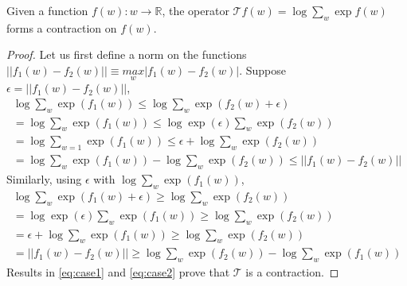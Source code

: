 \documentclass{article}
\begin{document}
\begin{customthm}{2}
  Given a function $f(w):w\rightarrow \mathbb{R}$, the operator $\mathcal{T}f(w)=\log \sum_{w} \exp{f(w)}$ forms a contraction on $f(w)$. 
\end{customthm}
\begin{proof}
  Let us first define a norm on the functions $||f_{1}(w) - f_{2}(w)|| \equiv \underset{w}{max}|f_{1}(w) - f_{2}(w)|$. Suppose $\epsilon = ||f_{1}(w) - f_{2}(w)||$,
  \begin{gather}
      \log \sum_{w}\exp{(f_{1}(w))} \leq \log \sum_{w}\exp{(f_{2}(w) + \epsilon)} \nonumber \\
      = \log \sum_{w}\exp{(f_{1}(w))} \leq \log \exp{(\epsilon)} \sum_{w}\exp{(f_{2}(w))} \nonumber \\
      = \log \sum_{w=1}\exp{(f_{1}(w))} \leq \epsilon + \log \sum_{w} \exp{(f_{2}(w))} \nonumber \\
      = \log \sum_{w} \exp{(f_{1}(w))} - \log \sum_{w} \exp{(f_{2}(w))} \leq ||f_{1}(w) - f_{2}(w)|| \label{eq:case1}
  \end{gather}
  Similarly, using $\epsilon$ with $\log \sum_{w} \exp{(f_{1}(w))}$,
  \begin{gather}
      \log \sum_{w}\exp{(f_{1}(w) + \epsilon)} \geq \log \sum_{w}\exp{(f_{2}(w))} \nonumber \\
      = \log \exp{(\epsilon)}\sum_{w}\exp{(f_{1}(w))} \geq \log \sum_{w}\exp{(f_{2}(w))} \nonumber \\
      = \epsilon + \log \sum_{w} \exp{(f_{1}(w))} \geq \log \sum_{w}\exp{(f_{2}(w))} \nonumber \\
      = ||f_{1}(w) - f_{2}(w)|| \geq \log \sum_{w} \exp{(f_{2}(w))} - \log \sum_{w} \exp{(f_{1}(w))} \label{eq:case2}
  \end{gather}
  Results in \autoref{eq:case1} and \autoref{eq:case2} prove that $\mathcal{T}$ is a contraction. 
\end{proof}
\end{document}

